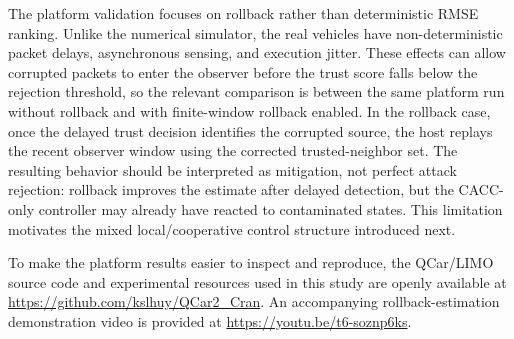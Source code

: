 \documentclass[journal,twoside]{IEEEtran}
\begin{document}
The platform validation focuses on rollback rather than deterministic RMSE ranking. Unlike the numerical simulator, the real vehicles have non-deterministic packet delays, asynchronous sensing, and execution jitter. These effects can allow corrupted packets to enter the observer before the trust score falls below the rejection threshold, so the relevant comparison is between the same platform run without rollback and with finite-window rollback enabled. In the rollback case, once the delayed trust decision identifies the corrupted source, the host replays the recent observer window using the corrected trusted-neighbor set. The resulting behavior should be interpreted as mitigation, not perfect attack rejection: rollback improves the estimate after delayed detection, but the CACC-only controller may already have reacted to contaminated states. This limitation motivates the mixed local/cooperative control structure introduced next.


To make the platform results easier to inspect and reproduce, the QCar/LIMO source code and experimental resources used in this study are openly available at \url{https://github.com/kslhuy/QCar2_Cran}. An accompanying rollback-estimation demonstration video is provided at \url{https://youtu.be/t6-soznp6ks}.
\end{document}
